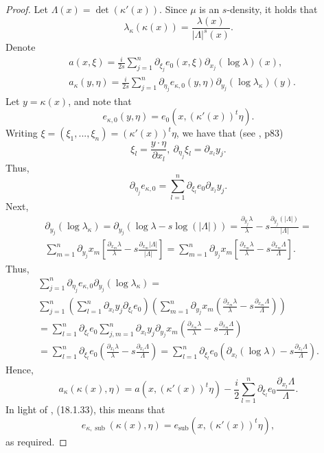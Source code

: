 \documentclass{article}
\DeclareMathOperator{\sub}{sub}
\begin{document}
\begin{proof}
Let $\Lambda(x) = \det(\kappa'(x))$. Since $\mu$ is an $s$-density, it holds that $$\lambda_\kappa(\kappa(x)) = \frac {\lambda(x)} {|\Lambda|^s(x)} .$$ 
%
Denote $$\begin{aligned} &a(x,\xi) = \frac i {2s}\sum_{j=1}^n \partial_{\xi_j} e_0(x, \xi) \partial_{x_j} (\log \lambda)(x),\\ &a_\kappa(y, \eta) = \frac i {2s}\sum_{j=1}^n \partial_{\eta_j} e_{\kappa,0}(y, \eta) \partial_{y_j}(\log \lambda_\kappa)(y).\end{aligned}$$
%
Let $y = \kappa(x)$, and note that $$e_{\kappa, 0}(y, \eta) = e_0(x, (\kappa'(x))^t \eta).$$
%
%
Writing $\xi = (\xi_1, ..., \xi_n) = (\kappa'(x))^t \eta$, we have that (see \cite{hormander3}, p83) $$\xi_l = \frac{y \cdot \eta }{\partial x_l},\ \partial_{\eta_j} \xi_l =\partial_{x_l} y_j .$$
Thus,
$$\partial_{\eta_j} e_{\kappa,0} = \sum_{l=1}^n \partial_{\xi_l} e_0 \partial_{x_l} y_j.$$
Next, \begin{multline*}\partial_{y_j}(\log \lambda_{\kappa}) = \partial_{y_j}\left(\log \lambda - s \log(|\Lambda|)\right) = \frac{\partial_{y_j} \lambda}{\lambda} - s \frac{\partial_{y_j} (|\Lambda|)}{|\Lambda|} =\\ \sum_{m=1}^n \partial_{y_j} x_m \left[ \frac{\partial_{x_m} \lambda}{\lambda} - s \frac{\partial_{x_m}|\Lambda|}{|\Lambda|} \right] = \sum_{m=1}^n \partial_{y_j} x_m \left[\frac{\partial_{x_m} \lambda}{\lambda} - s \frac{\partial_{x_m} \Lambda}{\Lambda} \right].\end{multline*}
Thus,
\begin{multline*} \sum_{j=1}^n \partial_{\eta_j} e_{\kappa,0} \partial_{y_j}(\log\lambda_\kappa) = \\ \sum_{j=1}^n  \left(\sum_{l=1}^n \partial_{x_l} y_j \partial_{\xi_l} e_{0}\right) \left(\sum_{m=1}^n \partial_{y_j} x_m \left(\frac{\partial_{x_m} \lambda} \lambda - s \frac{\partial_{x_m}\Lambda}{\Lambda} \right) \right)\\=\sum_{l=1}^n \partial_{\xi_l} e_0 \sum_{j,m = 1}^n \partial_{x_l} y_j \partial_{y_j} x_m \left(\frac{\partial_{x_m} \lambda}{\lambda} - s\frac{\partial_{x_m} \Lambda}{\Lambda}\right) \\= \sum_{l=1}^n \partial_{\xi_l} e_0 \left(\frac{\partial_{x_l} \lambda}{\lambda} - s \frac{\partial_{x_l} \Lambda}{\Lambda} \right) = \sum_{l=1}^n \partial_{\xi_l} e_0 \left(\partial_{x_l}(\log \lambda) - s\frac{\partial_{x_l}\Lambda}{\Lambda}\right).\end{multline*}
%
%
Hence, $$ a_{\kappa}(\kappa(x), \eta) = a(x, (\kappa'(x))^t \eta)-\frac i 2 \sum_{l=1}^n\partial_{\xi_l} e_0 \frac{\partial_{x_l} \Lambda}{\Lambda}.$$
In light of \cite{hormander3}, (18.1.33), this means that $$e_{\kappa,\sub}(\kappa(x), \eta) = e_{\sub}(x, (\kappa'(x))^t \eta),$$
as required.
\end{proof}
\end{document}
